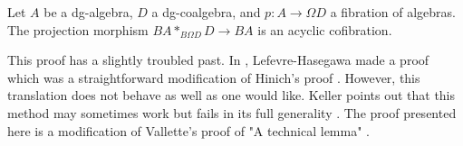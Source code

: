 \documentclass[../thesis.tex]{subfiles}
\begin{document}

            \begin{lemma}\label{lem: tech-fac}
                Let $A$ be a dg-algebra, $D$ a dg-coalgebra, and $p: A \rightarrow \Omega D$ a fibration of algebras. The projection morphism $BA\ast_{B\Omega D}D \rightarrow BA$ is an acyclic cofibration.
                \begin{center}
                \end{center}
            \end{lemma}

            This proof has a slightly troubled past. In \cite{LefevreHasegawa03}, Lefevre-Hasegawa made a proof which was a straightforward modification of Hinich's proof \cite[Key Lemma]{Hinich01}. However, this translation does not behave as well as one would like. Keller points out that this method may sometimes work but fails in its full generality \cite{Keller06}. The proof presented here is a modification of Vallette's proof of "A technical lemma" \cite[Appendix B]{Vallette20}.
\end{document}
